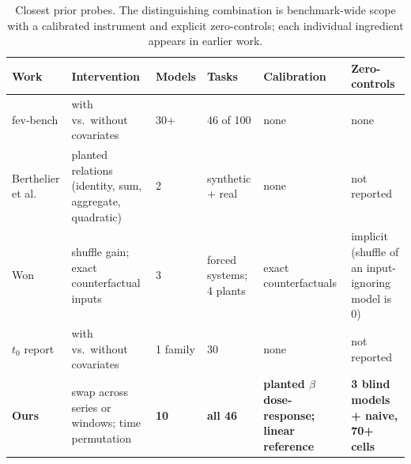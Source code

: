 \begin{table}[t]
\centering
\footnotesize
\begin{tabular}{@{}p{2.2cm}p{3.1cm}p{1.5cm}p{2.2cm}p{2.6cm}p{3.0cm}@{}}
\toprule
Work & Intervention & Models & Tasks & Calibration & Zero-controls \\
\midrule
fev-bench \citep{shchur2025fev} & with vs.\ without covariates & 30+ & 46 of 100 & none & none \\
Berthelier et al.\ \citep{berthelier2026investigating} & planted relations (identity, sum, aggregate, quadratic) & 2 & synthetic + real & none & not reported \\
Won \citep{won2026attenuated} & shuffle gain; exact counterfactual inputs & 3 & forced systems; 4 plants & exact counterfactuals & implicit (shuffle of an input-ignoring model is 0) \\
$t_0$ report \citep{meyer2026t0} & with vs.\ without covariates & 1 family & 30 & none & not reported \\
\textbf{Ours} & swap across series or windows; time permutation & \textbf{10} & \textbf{all 46} & \textbf{planted $\beta$ dose-response; linear reference} & \textbf{3 blind models + naive, 70+ cells} \\
\bottomrule
\end{tabular}
\caption{Closest prior probes. The distinguishing combination is benchmark-wide scope
with a calibrated instrument and explicit zero-controls; each individual ingredient
appears in earlier work.}
\label{tab:positioning}
\end{table}

